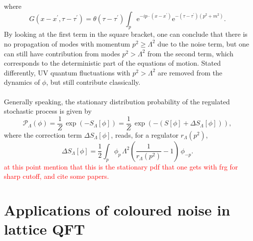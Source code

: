 where
\begin{equation*}
    G\left(x-x^{\prime}, \tau-\tau^{\prime}\right) =\theta\left(\tau-\tau^{\prime}\right) \int_p \mathrm{e}^{-i p \cdot\left(x-x^{\prime}\right)} \mathrm{e}^{-\left(\tau-\tau^{\prime}\right)\left(p^2+m^2\right)}.
\end{equation*}
By looking at the first term in the square bracket, one can conclude that there is no propagation of modes with momentum $p^2\geq \Lambda^2$ due to the noise term, but one can still have contribution from modes $p^2 > \Lambda^2$ from the second term, which corresponds to the deterministic part of the equations of motion. Stated differently, UV quantum fluctuations with $p^2 > \Lambda^2$ are removed from the dynamics of $\phi$, but still contribute classically. \\~\\
Generally speaking, the stationary distribution probability of the regulated stochastic process is given by \cite{Pawlowski2017CoolingNoise}
\begin{equation}
    \mathcal{P}_\Lambda(\phi) = \frac{1}{Z} \, \exp\left(-S_\Lambda[\phi]\right) = \frac{1}{Z} \, \exp\left(-(S[\phi] + \Delta S_\Lambda[\phi])\right),
    \label{eq:probability_field_configuration_regularised}
\end{equation}
where the correction term $\Delta S_\Lambda[\phi]$, reads, for a regulator $r_\Lambda(p^2)$,
\begin{equation*}
        \Delta S_{\Lambda}[\phi]=\frac{1}{2} \int_p \phi_p \, \Lambda^2\left(\frac{1}{r_{\Lambda}\left(p^2\right)}-1\right) \, \phi_{-p}.
\end{equation*}
\textcolor{red}{at this point mention that this is the stationary pdf that one gets with frg for sharp cutoff, and cite some papers.}

\section{Applications of coloured noise in lattice QFT}
\label{sec:lattice_with_coloured_noise}

